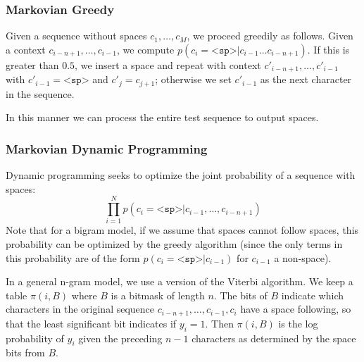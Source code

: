 \documentclass[11pt]{article}
\begin{document}
\subsubsection{Markovian Greedy}

%

Given a sequence without spaces $c_1, \ldots, c_M$, we proceed greedily as follows. Given a context $c_{i-n+1}, \ldots, c_{i-1}$, we compute $p(c_i = \texttt{<sp>} | c_{i-1} \ldots c_{i-n+1})$. If this is greater than $0.5$, we insert a space and repeat with context $c'_{i-n+1}, \ldots, c'_{i-1}$ with $c'_{i-1} = \texttt{<sp>}$ and $c'_j = c_{j+1}$; otherwise we set $c'_{i-1}$ as the next character in the sequence.

In this manner we can process the entire test sequence to output spaces.

\subsubsection{Markovian Dynamic Programming}

Dynamic programming seeks to optimize the joint probability of a sequence with spaces:
$$\prod_{i=1}^{N} p(c_i = \texttt{<sp>} | c_{i-1}, \ldots, c_{i-n+1})$$
Note that for a bigram model, if we assume that spaces cannot follow spaces, this probability can be optimized by the greedy algorithm (since the only terms in this probability are of the form $p(c_i = \texttt{<sp>} | c_{i-1})$ for $c_{i-1}$ a non-space).

In a general n-gram model, we use a version of the Viterbi algorithm. We keep a table $\pi(i, B)$ where $B$ is a bitmask of length $n$. The bits of $B$ indicate which characters in the original sequence $c_{i-n+1}, \ldots, c_{i-1}, c_i$ have a space following, so that the least significant bit indicates if $y_i = 1$. Then $\pi(i, B)$ is the log probability of $y_i$ given the preceding $n-1$ characters as determined by the space bits from $B$.
\end{document}
